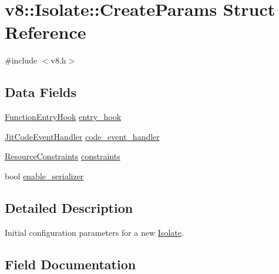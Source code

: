 \hypertarget{structv8_1_1Isolate_1_1CreateParams}{}\section{v8\+:\+:Isolate\+:\+:Create\+Params Struct Reference}
\label{structv8_1_1Isolate_1_1CreateParams}


{\ttfamily \#include $<$v8.\+h$>$}

\subsection*{Data Fields}
\begin{DoxyCompactItemize}
\item 
\hyperlink{namespacev8_aaf07fb6bb13f295da3c6568938b7dec5}{Function\+Entry\+Hook} \hyperlink{structv8_1_1Isolate_1_1CreateParams_aa7aa18bbe2d86713e5b074a93b38dc60}{entry\+\_\+hook}
\item 
\hyperlink{namespacev8_a39243bc91e63d64d111452fdb98c4733}{Jit\+Code\+Event\+Handler} \hyperlink{structv8_1_1Isolate_1_1CreateParams_a783e3eba90ce6e2800bdd69197bbccdd}{code\+\_\+event\+\_\+handler}
\item 
\hyperlink{classv8_1_1ResourceConstraints}{Resource\+Constraints} \hyperlink{structv8_1_1Isolate_1_1CreateParams_a2c570b306aa8c1c24cfe70e8eee50fa1}{constraints}
\item 
bool \hyperlink{structv8_1_1Isolate_1_1CreateParams_a6dae371b4c28bf7e8b3534dc24f13323}{enable\+\_\+serializer}
\end{DoxyCompactItemize}


\subsection{Detailed Description}
Initial configuration parameters for a new \hyperlink{classv8_1_1Isolate}{Isolate}. 

\subsection{Field Documentation}
\hypertarget{structv8_1_1Isolate_1_1CreateParams_a783e3eba90ce6e2800bdd69197bbccdd}{}

